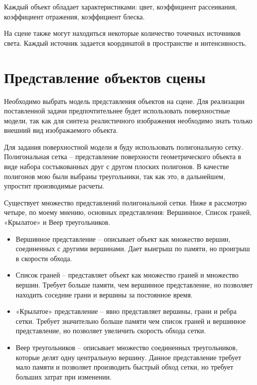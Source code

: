 \documentclass[12pt]{report}
\begin{document}
		Каждый объект обладает характеристиками: цвет, коэффициент рассеивания, коэффициент отражения, коэффициент блеска.
		
		На сцене также могут находиться некоторые количество точечных источников света. Каждый источник задается координатой в пространстве и интенсивность.
		
	\section{Представление объектов сцены}
	
	Необходимо выбрать модель представления объектов на сцене. Для реализации поставленной задачи предпочтительнее будет использовать поверхностные модели, так как для синтеза реалистичного изображения необходимо знать только внешний вид изображаемого объекта.
	
	Для задания поверхностной модели я буду использовать полигональную сетку. Полигональная сетка – представление поверхности геометрического объекта в виде набора состыкованных друг с другом плоских полигонов. В качестве полигонов мою были выбраны треугольники, так как это, в дальнейшем, упростит производимые расчеты.
	
	Существует множество представлений полигональной сетки. Ниже я рассмотрю четыре, по моему мнению, основных представления: Вершинное, Список граней, «Крылатое» и Веер треугольников.\cite{1}
	
	\begin{itemize}
		\item Вершинное представление – описывает объект как множество вершин, соединенных с другими вершинами. Дает выигрыш по памяти, но проигрыш в скорости обхода.
		\item Список граней – представляет объект как множество граней и множество вершин. Требует больше памяти, чем вершинное представление, но позволяет находить соседние грани и вершины за постоянное время.
		\item «Крылатое» представление – явно представляет вершины, грани и ребра сетки. Требует значительно больше памяти чем список граней и вершинное представление, но позволяет увеличить скорость обхода сетки.
		\item Веер треугольников – описывает множество соединенных треугольников, которые делят одну центральную вершину. Данное представление требует мало памяти и позволяет производить быстрый обход сетки, но требует больших затрат при изменении.
	\end{itemize}
\end{document}
